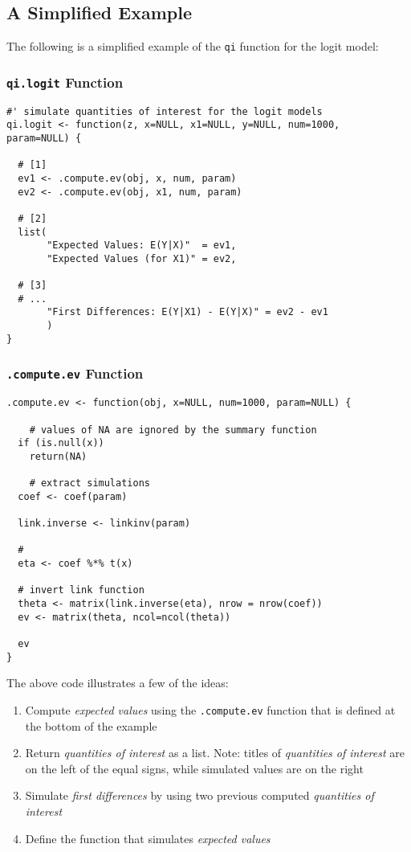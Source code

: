 \documentclass{article}
\newcommand{\code}[1]{{\tt #1}}
\begin{document}
\pagebreak
\subsection{A Simplified Example}

The following is a simplified example of the \code{qi} function for the logit model:


\subsubsection{\code{qi.logit} Function}
\begin{verbatim}
#' simulate quantities of interest for the logit models
qi.logit <- function(z, x=NULL, x1=NULL, y=NULL, num=1000,
param=NULL) {

  # [1]
  ev1 <- .compute.ev(obj, x, num, param)
  ev2 <- .compute.ev(obj, x1, num, param)

  # [2]
  list(
       "Expected Values: E(Y|X)"  = ev1,
       "Expected Values (for X1)" = ev2,
       
  # [3]
  # ...
       "First Differences: E(Y|X1) - E(Y|X)" = ev2 - ev1
       )
}
\end{verbatim}


\subsubsection{\code{.compute.ev} Function}
\begin{verbatim}
.compute.ev <- function(obj, x=NULL, num=1000, param=NULL) {

	# values of NA are ignored by the summary function
  if (is.null(x))
    return(NA)

	# extract simulations
  coef <- coef(param)
  
  link.inverse <- linkinv(param)

  # 
  eta <- coef %*% t(x)

  # invert link function
  theta <- matrix(link.inverse(eta), nrow = nrow(coef))
  ev <- matrix(theta, ncol=ncol(theta))

  ev
}  
\end{verbatim}

\noindent The above code illustrates a few of the ideas:

\begin{enumerate}

	\item Compute \emph{expected values} using the \code{.compute.ev} function
		that is defined at the bottom of the example
	
	\item Return \emph{quantities of interest} as a list. Note: titles of
		\emph{quantities of interest} are on the left of the equal signs, while
		simulated values are on the right
		
	\item Simulate \emph{first differences} by using two previous computed
	  \emph{quantities of interest}
	  
	\item Define the function that simulates \emph{expected values}

\end{enumerate}
\end{document}
